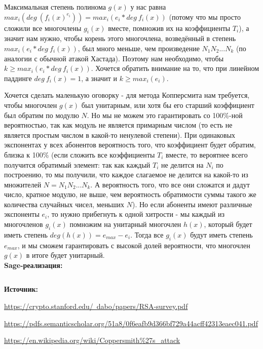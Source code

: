 \documentclass[12pt,a4paper]{scrartcl}
\begin{document}
Максимальная степень полинома $g(x)$ у нас равна $max_i(deg\ (f_i(x)^{e_i}))=max_i(e_i*deg\ f_i(x))$ (потому что мы просто сложили все многочлены $g_i(x)$ вместе, помножив их на коэффициенты $T_i$), а значит нам нужно, чтобы корень этого многочлена, возведённый в степень $max_i(e_i*deg\ f_i(x))$, был много меньше, чем произведение $N_1N_2...N_k$ (по аналогии с обычной атакой Хастада). Поэтому нам необходимо, чтобы $k\geq max_i(e_i*deg\ f_i(x))$. Хочется обратить внимание на то, что при линейном паддинге $deg\ f_i(x)=1$, а значит и $k\geq max_i(e_i)$.

Хочется сделать маленькую оговорку - для метода Копперсмита нам требуется, чтобы многочлен $g(x)$ был унитарным, или хотя бы его старший коэффициент был обратим по модулю $N$. Но мы не можем это гарантировать со 100\%-ной вероятностью, так как модуль не является примарным числом (то есть не является простым числом в какой-то ненулевой степени). При одинаковых экспонентах у всех абонентов вероятность того, что коэффициент будет обратим, близка к 100\% (если сложить все коэффициенты $T_i$ вместе, то вероятнее всего получится обратимый элемент: так как каждый $T_i$ не делится на $N_i$ по построению, то мы получили, что каждое слагаемое не делится на какой-то из множителей $N=N_1N_2...N_k$. А вероятность того, что все они сложатся и дадут число, кратное модулю, не выше, чем вероятность обратимости суммы такого же количества случайных чисел, меньших $N$). Но если абоненты имеют различные экспоненты $e_i$, то нужно прибегнуть к одной хитрости - мы каждый из многочленов $g_i(x)$ помножим на унитарный многочлен $h(x)$, который будет иметь степень $deg(h(x)) = e_{max}-e_i$. Тогда все $g_i(x)$ будут иметь степень $e_{max}$, и мы сможем гарантировать с высокой долей вероятности, что многочлен $g(x)$ в итоге будет унитарный.\\

\textbf{Sage-реализация:}

\inputminted[tabsize=4,obeytabs,fontsize=\footnotesize]{python3}{./RSA_scripts/hastad_extend.sage}

\textbf{Источник:}

\href{https://crypto.stanford.edu/~dabo/papers/RSA-survey.pdf}{https://crypto.stanford.edu/~dabo/papers/RSA-survey.pdf}

\href{https://pdfs.semanticscholar.org/51a8/0f6eafb9d366bf729a44acff42313eaec041.pdf}{https://pdfs.semanticscholar.org/51a8/0f6eafb9d366bf729a44acff42313eaec041.pdf}

\href{https://en.wikipedia.org/wiki/Coppersmith%27s_attack}{https://en.wikipedia.org/wiki/Coppersmith\%27s\_attack}
\end{document}
